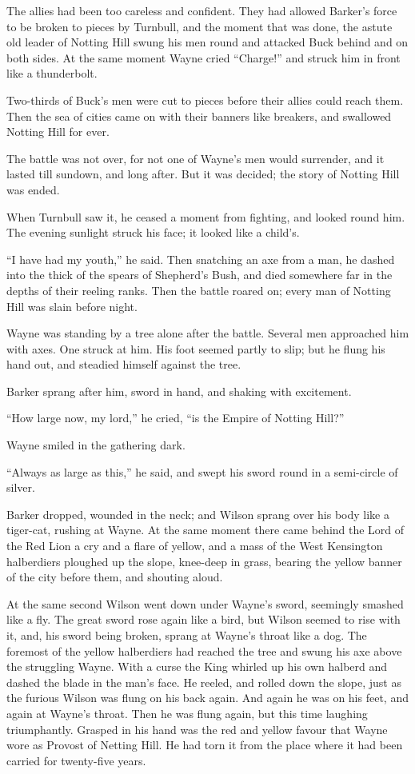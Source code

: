 \documentclass{book}
\begin{document}
The allies had been too careless and confident. They had allowed Barker’s force to be broken to pieces by Turnbull, and the moment that was done, the astute old leader of Notting Hill swung his men round and attacked Buck behind and on both sides. At the same moment Wayne cried “Charge!” and struck him in front like a thunderbolt.

Two-thirds of Buck’s men were cut to pieces before their allies could reach them. Then the sea of cities came on with their banners like breakers, and swallowed Notting Hill for ever.

The battle was not over, for not one of Wayne’s men would surrender, and it lasted till sundown, and long after. But it was decided; the story of Notting Hill was ended.

When Turnbull saw it, he ceased a moment from fighting, and looked round him. The evening sunlight struck his face; it looked like a child’s.

“I have had my youth,” he said. Then snatching an axe from a man, he dashed into the thick of the spears of Shepherd’s Bush, and died somewhere far in the depths of their reeling ranks. Then the battle roared on; every man of Notting Hill was slain before night.

Wayne was standing by a tree alone after the battle. Several men approached him with axes. One struck at him. His foot seemed partly to slip; but he flung his hand out, and steadied himself against the tree.

Barker sprang after him, sword in hand, and shaking with excitement.

“How large now, my lord,” he cried, “is the Empire of Notting Hill?”

Wayne smiled in the gathering dark.

“Always as large as this,” he said, and swept his sword round in a semi-circle of silver.

Barker dropped, wounded in the neck; and Wilson sprang over his body like a tiger-cat, rushing at Wayne. At the same moment there came behind the Lord of the Red Lion a cry and a flare of yellow, and a mass of the West Kensington halberdiers ploughed up the slope, knee-deep in grass, bearing the yellow banner of the city before them, and shouting aloud.

At the same second Wilson went down under Wayne’s sword, seemingly smashed like a fly. The great sword rose again like a bird, but Wilson seemed to rise with it, and, his sword being broken, sprang at Wayne’s throat like a dog. The foremost of the yellow halberdiers had reached the tree and swung his axe above the struggling Wayne. With a curse the King whirled up his own halberd and dashed the blade in the man’s face. He reeled, and rolled down the slope, just as the furious Wilson was flung on his back again. And again he was on his feet, and again at Wayne’s throat. Then he was flung again, but this time laughing triumphantly. Grasped in his hand was the red and yellow favour that Wayne wore as Provost of Netting Hill. He had torn it from the place where it had been carried for twenty-five years.
\end{document}
